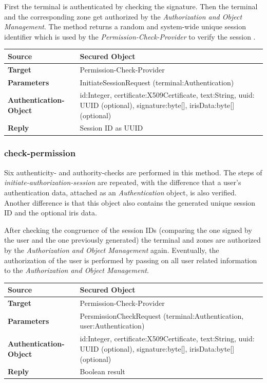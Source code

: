 \documentclass[12pt,a4paper,titlepage,oneside]{scrartcl}
\begin{document}
First the terminal is authenticated by checking the signature. Then the terminal and the corresponding zone get authorized by the \emph{Authorization and Object Management}. The method returns a random and system-wide unique session identifier which is used by the \emph{Permission-Check-Provider} to verify the session .

\begin{table}[h]
    \centering
    \begin{tabular}{|l|p{12cm}|} \hline
    \textbf{Source}&Secured Object\\ \hline
    \textbf{Target}&Permission-Check-Provider\\ \hline
    \textbf{Parameters}&InitiateSessionRequest (terminal:Authentication)\\ \hline
    \textbf{Authentication-Object}&id:Integer, certificate:X509Certificate, text:String, uuid: UUID (optional), signature:byte[], irisData:byte[] (optional)\\ \hline
    \textbf{Reply}&Session ID as UUID\\ \hline
    \end{tabular}
\end{table}

\subsubsection{check-permission}
Six authenticity- and authority-checks are performed in this method. The steps of \emph{initiate-authorization-session} are repeated, with the difference that a user's authentication data, attached as an \emph{Authentication} object, is also verified. Another difference is that this object also contains the  generated unique session ID and the optional iris data.

After checking the congruence of the session IDs (comparing the one signed by the user and the one previously generated) the terminal and zones are authorized by the \emph{Authorization and Object Management} again. Eventually, the authorization of the user is performed by passing on all user related information to the \emph{Authorization and Object Management}.

\begin{table}[h]
    \centering
    \begin{tabular}{|l|p{12cm}|} \hline
    \textbf{Source}&Secured Object\\ \hline
    \textbf{Target}&Permission-Check-Provider\\ \hline
    \textbf{Parameters}&PersmissionCheckRequest (terminal:Authentication, user:Authentication)\\ \hline
    \textbf{Authentication-Object}&id:Integer, certificate:X509Certificate, text:String, uuid: UUID (optional), signature:byte[], irisData:byte[] (optional)\\ \hline
    \textbf{Reply}&Boolean result\\ \hline
    \end{tabular}
\end{table}
\end{document}
